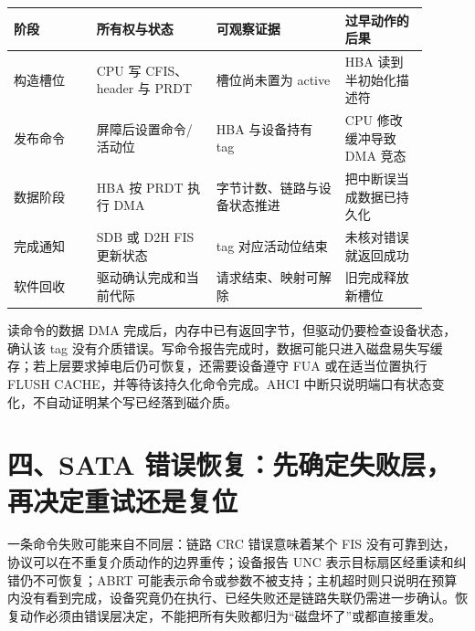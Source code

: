 \begin{longtable}{L{0.18\linewidth}L{0.26\linewidth}L{0.28\linewidth}L{0.18\linewidth}}
\toprule
阶段 & 所有权与状态 & 可观察证据 & 过早动作的后果 \\
\midrule
构造槽位 & CPU 写 CFIS、header 与 PRDT & 槽位尚未置为 active & HBA 读到半初始化描述符 \\\tablerowrule
发布命令 & 屏障后设置命令/活动位 & HBA 与设备持有 tag & CPU 修改缓冲导致 DMA 竞态 \\\tablerowrule
数据阶段 & HBA 按 PRDT 执行 DMA & 字节计数、链路与设备状态推进 & 把中断误当成数据已持久化 \\\tablerowrule
完成通知 & SDB 或 D2H FIS 更新状态 & tag 对应活动位结束 & 未核对错误就返回成功 \\\tablerowrule
软件回收 & 驱动确认完成和当前代际 & 请求结束、映射可解除 & 旧完成释放新槽位 \\
\bottomrule
\end{longtable}


读命令的数据 DMA 完成后，内存中已有返回字节，但驱动仍要检查设备状态，确认该 tag 没有介质错误。写命令报告完成时，数据可能只进入磁盘易失写缓存；若上层要求掉电后仍可恢复，还需要设备遵守 FUA 或在适当位置执行 FLUSH CACHE，并等待该持久化命令完成。AHCI 中断只说明端口有状态变化，不自动证明某个写已经落到磁介质。

\section{四、SATA 错误恢复：先确定失败层，再决定重试还是复位}

一条命令失败可能来自不同层：链路 CRC 错误意味着某个 FIS 没有可靠到达，协议可以在不重复介质动作的边界重传；设备报告 UNC 表示目标扇区经重读和纠错仍不可恢复；ABRT 可能表示命令或参数不被支持；主机超时则只说明在预算内没有看到完成，设备究竟仍在执行、已经失败还是链路失联仍需进一步确认。恢复动作必须由错误层决定，不能把所有失败都归为“磁盘坏了”或都直接重发。

